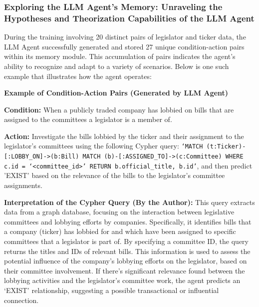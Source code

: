 \documentclass[15pt,letterpaper]{article}
\begin{document}
\subsubsection{Exploring the LLM Agent's Memory: Unraveling the Hypotheses and Theorization Capabilities of the LLM Agent}

During the training involving 20 distinct pairs of legislator and ticker data, the LLM Agent successfully generated and stored 27 unique condition-action pairs within its memory module. 
This accumulation of pairs indicates the agent's ability to recognize and adapt to a variety of scenarios. 
Below is one such example that illustrates how the agent operates:

\vspace{5mm} %

\begin{mdframed}
\textbf{Example of Condition-Action Pairs (Generated by LLM Agent)}

\textbf{Condition:} When a publicly traded company has lobbied on bills that are assigned to the committees a legislator is a member of.

\textbf{Action:} Investigate the bills lobbied by the ticker and their assignment to the legislator's committees using the following Cypher query: \texttt{`MATCH (t:Ticker)-[:LOBBY\_ON]->(b:Bill) MATCH (b)-[:ASSIGNED\_TO]->(c:Committee) WHERE c.id = `<committee\_id>' RETURN b.official\_title, b.id'}, and then predict 'EXIST' based on the relevance of the bills to the legislator's committee assignments.

\textbf{Interpretation of the Cypher Query (By the Author):} This query extracts data from a graph database, focusing on the interaction between legislative committees and lobbying efforts by companies. Specifically, it identifies bills that a company (ticker) has lobbied for and which have been assigned to specific committees that a legislator is part of. By specifying a committee ID, the query returns the titles and IDs of relevant bills. This information is used to assess the potential influence of the company's lobbying efforts on the legislator, based on their committee involvement. 
If there's significant relevance found between the lobbying activities and the legislator's committee work, the agent predicts an `EXIST' relationship, suggesting a possible transactional or influential connection.
\end{mdframed}

\vspace{5mm} %
\end{document}
